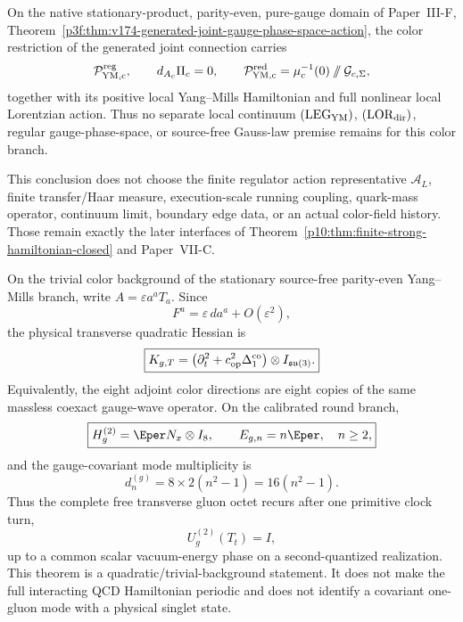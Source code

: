 \documentclass[12pt,a4paper]{article}
\begin{document}
\begin{corollary}
\label{p10:cor:v174-local-color-phase-space-hamiltonian}
On the native stationary-product, parity-even, pure-gauge domain of
Paper~III-F,
Theorem~\ref{p3f:thm:v174-generated-joint-gauge-phase-space-action}, the
color restriction of the generated joint connection carries
\[
 \mathcal P_{\rm YM,c}^{\rm reg},
 \qquad
 d_{A_c}\Pi_c=0,
 \qquad
 \mathcal P_{\rm YM,c}^{\rm red}
 =\mu_c^{-1}(0)\mathbin{/\mkern-6mu/}\mathcal G_{c,\Sigma},
\]
together with its positive local Yang--Mills Hamiltonian and full nonlinear
local Lorentzian action.  Thus no separate local continuum
\((\mathrm{LEG}_{\rm YM})\), \((\mathrm{LOR}_{\rm dir})\), regular
gauge-phase-space, or source-free Gauss-law premise remains for this color
branch.

This conclusion does not choose the finite regulator action representative
\(\mathcal A_L\), finite transfer/Haar measure, execution-scale running
coupling, quark-mass operator, continuum limit, boundary edge data, or an
actual color-field history.  Those remain exactly the later interfaces of
Theorem~\ref{p10:thm:finite-strong-hamiltonian-closed} and Paper~VII-C.
\end{corollary}



\begin{theorem}
\label{p10:thm:v245-free-gluon-octet-clock-lock}
On the trivial color background of the stationary source-free parity-even
Yang--Mills branch, write \(A=\varepsilon a^aT_a\).  Since
\[
 F^a=\varepsilon\,da^a+O(\varepsilon^2),
\]
the physical transverse quadratic Hessian is
\[
 \boxed{K_{g,T}
 =\left(\partial_t^2+c_{\rm op}^2\Delta_1^{\rm co}\right)
 \otimes I_{\mathfrak{su}(3)}.}
\]
Equivalently, the eight adjoint color directions are eight copies of the same
massless coexact gauge-wave operator.  On the calibrated round branch,
\[
 \boxed{H_g^{(2)}=\Eper N_x\otimes I_8,
 \qquad E_{g,n}=n\Eper,\quad n\ge2,}
\]
and the gauge-covariant mode multiplicity is
\[
 \boxed{d_n^{(g)}=8\times2(n^2-1)=16(n^2-1).}
\]
Thus the complete free transverse gluon octet recurs after one primitive clock
turn,
\[
 \boxed{U_g^{(2)}(T_t)=I,}
\]
up to a common scalar vacuum-energy phase on a second-quantized realization.
This theorem is a quadratic/trivial-background statement.  It does not make
the full interacting QCD Hamiltonian periodic and does not identify a
covariant one-gluon mode with a physical singlet state.
\end{theorem}
\end{document}

